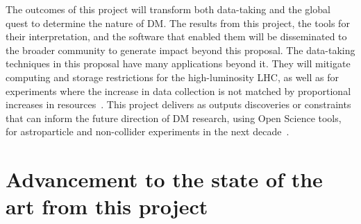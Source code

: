\documentclass[11pt,a4paper]{article}
\begin{document}
The outcomes of this project will transform both data-taking and the global quest to determine the nature of DM. 
The results from this project, the tools for their interpretation, and the software that enabled them 
will be disseminated to the broader community to generate impact beyond this proposal. 
The data-taking techniques in this proposal have many applications beyond it. They will mitigate computing and storage restrictions for the high-luminosity LHC, as well as for experiments where the increase in data collection is not matched by proportional increases in resources~\cite{Alves:2017she,Allen:2018yvz}. 
This project delivers as outputs discoveries or constraints that can inform the future direction of DM research, using Open Science tools, for astroparticle and non-collider experiments in the next decade~\cite{APPECStrategy,Beacham:2019nyx}. 


\section{Advancement to the state of the art from this project} 
\smallskip
\end{document}
